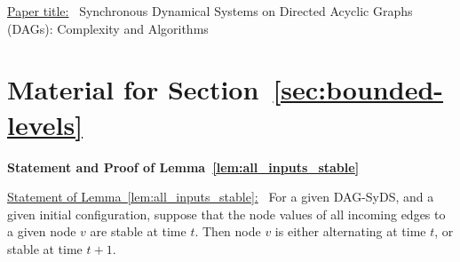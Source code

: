 
\appendix

\onecolumn

\begin{center}
\end{center}

\bigskip

\noindent
\underline{Paper title:}~
Synchronous Dynamical Systems on Directed Acyclic Graphs (DAGs): 
Complexity and Algorithms

\bigskip


\noindent
\section{Material for Section~\ref{sec:bounded-levels}}

\medskip

\iffalse
\noindent
\textbf{Statement and Proof of Proposition~\ref{pro:long_phase_space_cycle}}

\medskip

\underline{Statement of Proposition~\ref{pro:long_phase_space_cycle}:}~
For every $n  > 1$, there is an $n$ node DAG-SyDS
whose phase space graph is a cycle of length $2^n$.

\medskip

\noindent
\textbf{Proof:}~
For a given $n > 1$ we construct the DAG-SyDS $S_n$ to be a counter,
as follows.  The underlying graph contains $n$ levels, one node per
level.  For each node, there is an incoming edge from the nodes on
each of the lower levels.  The transition function for each node
is the function that retains the current value of the node if any
of the lower order bits is 0, and changes the value of the node if
all of the lower order bits are 1.

Suppose a given configuration of $S_n$ is interpreted as encoding
an integer $k$, $0 \leq k < 2^n$.  Then the successor configuration
encodes the integer $k + 1 \mod 2^n$.  Thus, the phase space of
$S_n$ is a cycle of length $2^n$.  \QED
\fi


\noindent
\textbf{Statement and Proof of Lemma~\ref{lem:all_inputs_stable}}

\medskip

\noindent
\underline{Statement of Lemma~\ref{lem:all_inputs_stable}:}~
For a given DAG-SyDS, and a given initial configuration, suppose
that the node values of all incoming edges to a given node $v$ are
stable at time $t$.  Then node $v$ is either alternating at time
$t$, or stable at time $t+1$.


